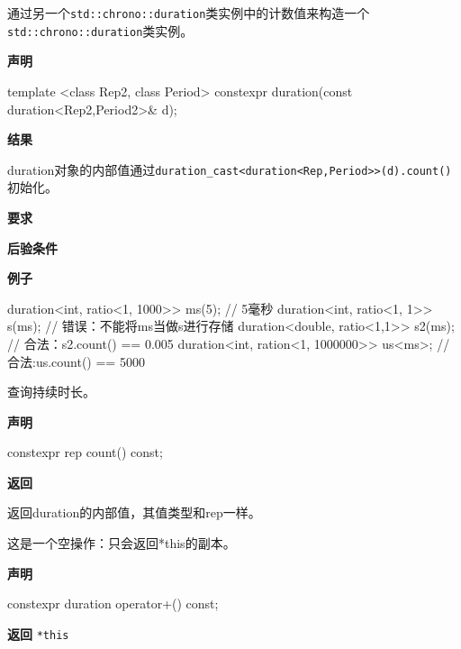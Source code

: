 
通过另一个\texttt{std::chrono::duration}类实例中的计数值来构造一个\texttt{std::chrono::duration}类实例。

\textbf{声明}

\begin{cpp}
template <class Rep2, class Period>
constexpr duration(const duration<Rep2,Period2>& d);
\end{cpp}

\textbf{结果}

duration对象的内部值通过\texttt{duration\_cast<duration<Rep,Period>>(d).count()}初始化。

\textbf{要求}


\textbf{后验条件}


\textbf{例子}

\begin{cpp}
duration<int, ratio<1, 1000>> ms(5);  // 5毫秒
duration<int, ratio<1, 1>> s(ms);  // 错误：不能将ms当做s进行存储
duration<double, ratio<1,1>> s2(ms);  // 合法：s2.count() == 0.005
duration<int, ration<1, 1000000>> us<ms>;  // 合法:us.count() == 5000
\end{cpp}


查询持续时长。

\textbf{声明}

\begin{cpp}
constexpr rep count() const;
\end{cpp}

\textbf{返回}

返回duration的内部值，其值类型和rep一样。


这是一个空操作：只会返回*this的副本。

\textbf{声明}

\begin{cpp}
constexpr duration operator+() const;
\end{cpp}

\textbf{返回}
\texttt{*this}

